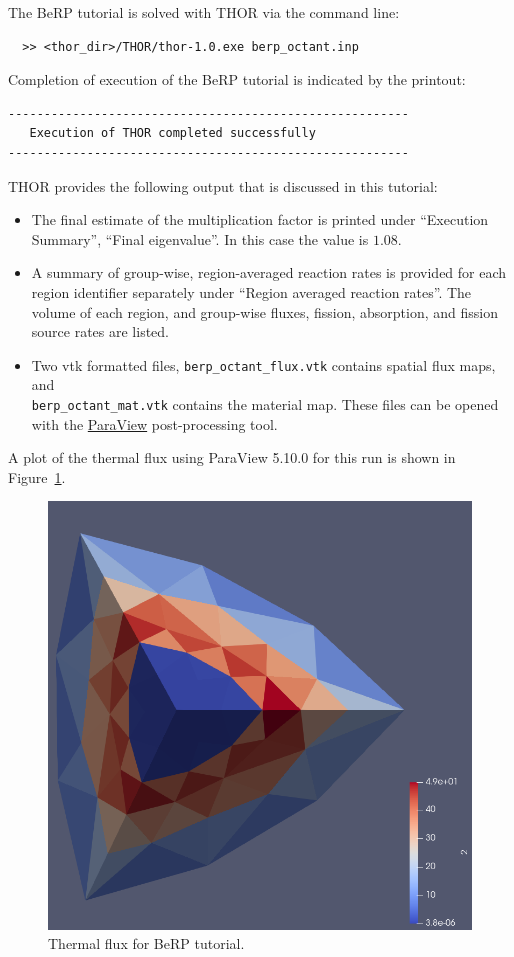 The BeRP tutorial is solved with \ac{THOR} via the command line:
\begin{verbatim}
  >> <thor_dir>/THOR/thor-1.0.exe berp_octant.inp
\end{verbatim}

Completion of execution of the BeRP tutorial is indicated by the printout:
\begin{verbatim}
--------------------------------------------------------
   Execution of THOR completed successfully
--------------------------------------------------------
\end{verbatim}

\ac{THOR} provides the following output that is discussed in this tutorial:
\begin{itemize}
    \item The final estimate of the multiplication factor is printed under ``Execution Summary'', ``Final eigenvalue''.
    In this case the value is $1.08$.
    \item A summary of group-wise, region-averaged reaction rates is provided for each region identifier separately under ``Region averaged reaction rates''.
    The volume of each region, and group-wise fluxes, fission, absorption, and fission source rates are listed.
    \item Two vtk formatted files, \verb"berp_octant_flux.vtk" contains spatial flux maps, and \\
    \verb"berp_octant_mat.vtk" contains the material map. These files can be opened with the \href{https://www.paraview.org/download/}{ParaView} post-processing tool.
\end{itemize}

A plot of the thermal flux using ParaView 5.10.0 for this run is shown in Figure~\ref{fig:berp_thermal}.
\begin{figure}[th]
  \center
  \includegraphics[height=0.5\textwidth]{chapters/tutorials/figures/berp_thermal.png}
  \caption{Thermal flux for BeRP tutorial.}
  \label{fig:berp_thermal}
\end{figure}

